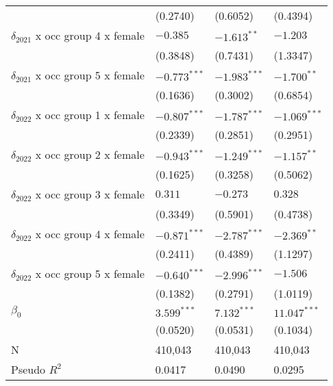 \begin{tabular}{llll}
                                       &           (0.2740) &           (0.6052) &           (0.4394) \\
$\delta_{2021}$ x occ group 4 x female &           $-0.385$ &      $-1.613^{**}$ &           $-1.203$ \\
                                       &           (0.3848) &           (0.7431) &           (1.3347) \\
$\delta_{2021}$ x occ group 5 x female &     $-0.773^{***}$ &     $-1.983^{***}$ &      $-1.700^{**}$ \\
                                       &           (0.1636) &           (0.3002) &           (0.6854) \\
$\delta_{2022}$ x occ group 1 x female &     $-0.807^{***}$ &     $-1.787^{***}$ &     $-1.069^{***}$ \\
                                       &           (0.2339) &           (0.2851) &           (0.2951) \\
$\delta_{2022}$ x occ group 2 x female &     $-0.943^{***}$ &     $-1.249^{***}$ &      $-1.157^{**}$ \\
                                       &           (0.1625) &           (0.3258) &           (0.5062) \\
$\delta_{2022}$ x occ group 3 x female &            $0.311$ &           $-0.273$ &            $0.328$ \\
                                       &           (0.3349) &           (0.5901) &           (0.4738) \\
$\delta_{2022}$ x occ group 4 x female &     $-0.871^{***}$ &     $-2.787^{***}$ &      $-2.369^{**}$ \\
                                       &           (0.2411) &           (0.4389) &           (1.1297) \\
$\delta_{2022}$ x occ group 5 x female &     $-0.640^{***}$ &     $-2.996^{***}$ &           $-1.506$ \\
                                       &           (0.1382) &           (0.2791) &           (1.0119) \\
$\beta_0$                              &      $3.599^{***}$ &      $7.132^{***}$ &     $11.047^{***}$ \\
                                       &           (0.0520) &           (0.0531) &           (0.1034) \\
N                                      &            410,043 &            410,043 &            410,043 \\
Pseudo $R^2$                           &             0.0417 &             0.0490 &             0.0295 \\
\bottomrule
\end{tabular}
